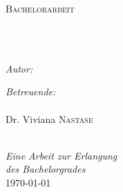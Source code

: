 \documentclass[
captions=nooneline,
11pt, %
ngerman, %
singlespacing, %
headsepline, %
]{MastersDoctoralThesis} %
\author{Dennis \textsc{Ulmer}} %
\begin{document}
\frontmatter %

\pagestyle{plain} %


\begin{titlepage}
\begin{center}

{\scshape\LARGE \univname\par}\vspace{1.5cm} %
\textsc{\Large Bachelorarbeit}\\[0.5cm] %

\HRule \\[0.4cm] %
{\huge \bfseries \ttitle\par}\vspace{0.4cm} %
\HRule \\[1.5cm] %

\begin{minipage}[t]{0.4\textwidth}
\begin{flushleft} \large
\emph{Autor:}\\
{\authorname} %
\end{flushleft}
\end{minipage}
\begin{minipage}[t]{0.4\textwidth}
\begin{flushright} \large
\emph{Betreuende:} \\
{\supname\\Dr. Viviana \textsc{Nastase}} %
\end{flushright}
\end{minipage}\\[3cm]

\large \textit{Eine Arbeit zur Erlangung \\ des Bachelorgrades}\\[0.3cm] %

{\large \today}\\[4cm] %

\vfill
\end{center}
\end{titlepage}
\end{document}
